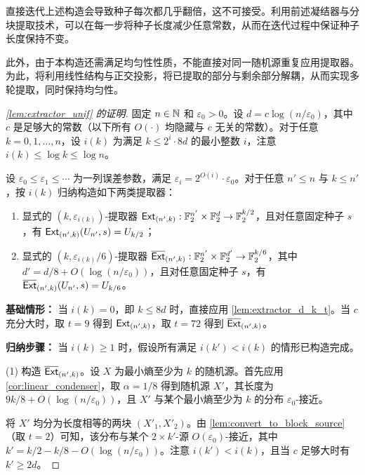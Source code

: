 直接迭代上述构造会导致种子每次都几乎翻倍，这不可接受。利用前述凝结器与分块提取技术，可以在每一步将种子长度减少任意常数，从而在迭代过程中保证种子长度保持不变。

此外，由于本构造还需满足均匀性性质，不能直接对同一随机源重复应用提取器。为此，将利用线性结构与正交投影，将已提取的部分与剩余部分解耦，从而实现多轮提取，同时保持均匀性。


\begin{proof}[\cref{lem:extractor_unif} 的证明]
    固定 $n \in \mathbb{N}$ 和 $\varepsilon_0 > 0$。设 $d = c \log (n / \varepsilon_0)$，其中 $c$ 是足够大的常数（以下所有 $O(\cdot)$ 均隐藏与 $c$ 无关的常数）。对于任意 $k = 0,1,\ldots,n$，设 $i(k)$ 为满足 $k \le 2^i \cdot 8d$ 的最小整数 $i$，注意 $i(k) \le \log k \le \log n$。

    设 $\varepsilon_0 \le \varepsilon_1 \le \cdots$ 为一列误差参数，满足 $\varepsilon_i = 2^{O(i)} \cdot \varepsilon_0$。对于任意 $n' \le n$ 与 $k \le n'$，按 $i(k)$ 归纳构造如下两类提取器：
    \begin{enumerate}
        \item 显式的 $(k, \varepsilon_{i(k)})$-提取器 $\mathsf{Ext}_{(n', k)} : \mathbb{F}_2^{n'} \times \mathbb{F}_2^d \to \mathbb{F}_2^{k/2}$，且对任意固定种子 $s$，有 $\mathsf{Ext}_{(n', k)}(U_{n'}, s) = U_{k/2}$；
        
        \item 显式的 $(k, \varepsilon_{i(k)}/6)$-提取器 $\overline{\mathsf{Ext}}_{(n', k)} : \mathbb{F}_2^{n'} \times \mathbb{F}_2^{d'} \to \mathbb{F}_2^{k/6}$，其中 $d' = d/8 + O(\log(n/\varepsilon_0))$，且对任意固定种子 $s$，有 $\overline{\mathsf{Ext}}_{(n', k)}(U_{n'}, s) = U_{k/6}$。
    \end{enumerate}

    \textbf{基础情形：} 当 $i(k) = 0$，即 $k \le 8d$ 时，直接应用 \cref{lem:extractor_d_k_t}。当 $c$ 充分大时，取 $t=9$ 得到 $\mathsf{Ext}_{(n',k)}$，取 $t=72$ 得到 $\overline{\mathsf{Ext}}_{(n',k)}$。

    \medskip

    \textbf{归纳步骤：} 当 $i(k) \ge 1$ 时，假设所有满足 $i(k') < i(k)$ 的情形已构造完成。

    (1) 构造 $\overline{\mathsf{Ext}}_{(n', k)}$。设 $X$ 为最小熵至少为 $k$ 的随机源。首先应用 \cref{cor:linear_condenser}，取 $\alpha = 1 / 8$ 得到随机源 $X'$，其长度为 $9k/8 + O(\log(n/\varepsilon_0))$，且 $X'$ 与某个最小熵至少为 $k$ 的分布 $\varepsilon_0$-接近。

    将 $X'$ 均分为长度相等的两块 $(X'_1, X'_2)$。由 \cref{lem:convert_to_block_source}（取 $t=2$）可知，该分布与某个 $2 \times k'$-源 $O(\varepsilon_0)$-接近，其中 $k' = k/2 - k/8 - O(\log(n/\varepsilon_0))$。注意 $i(k') < i(k)$，且当 $c$ 足够大时有 $k' \ge 2d$。


\end{proof}
